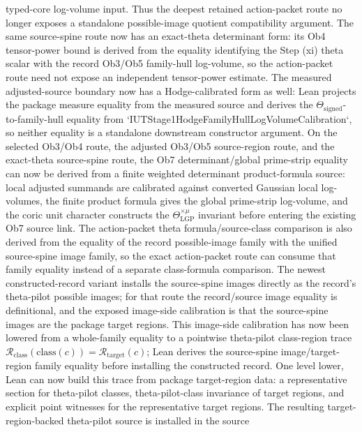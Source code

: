 \begin{proposition}
  typed-core log-volume input.
  Thus the deepest retained action-packet route no longer exposes a standalone
  possible-image quotient compatibility argument.  The same source-spine route
  now has an exact-theta determinant form: its Ob4 tensor-power bound is
  derived from the equality identifying the Step (xi) theta scalar with the
  record Ob3/Ob5 family-hull log-volume, so the action-packet route need not
  expose an independent tensor-power estimate.  The measured adjusted-source
  boundary now has a Hodge-calibrated form as well: Lean projects the package
  measure equality from the measured source and derives the
  \(\Theta_{\mathrm{signed}}\)-to-family-hull equality from
  `IUTStage1HodgeFamilyHullLogVolumeCalibration`, so neither equality is a
  standalone downstream constructor argument.  On the selected Ob3/Ob4 route,
  the adjusted Ob3/Ob5 source-region route, and the exact-theta source-spine
  route, the Ob7 determinant/global prime-strip equality can now be derived
  from a finite weighted determinant product-formula source: local adjusted
  summands are calibrated against converted Gaussian local log-volumes, the
  finite product formula gives the global prime-strip log-volume, and the
  coric unit character constructs the
  \(\Theta^{\times\mu}_{\mathrm{LGP}}\) invariant before entering the existing
  Ob7 source link.  The action-packet theta
  formula/source-class comparison is also derived from the equality of the
  record possible-image family with the unified source-spine image family, so
  the exact action-packet route can consume that family equality instead of a
  separate class-formula comparison.  The newest constructed-record variant
  installs the source-spine images directly as the record's theta-pilot
  possible images; for that route the record/source image equality is
  definitional, and the exposed image-side calibration is that the source-spine
  images are the package target regions.  This image-side calibration has now
  been lowered from a whole-family equality to a pointwise theta-pilot
  class-region trace
  \(\mathcal R_{\mathrm{class}}(\mathrm{class}(c))
    = \mathcal R_{\mathrm{target}}(c)\);
  Lean derives the source-spine image/target-region family equality before
  installing the constructed record.  One level lower, Lean can now build this
  trace from package target-region data: a representative section for
  theta-pilot classes, theta-pilot-class invariance of target regions, and
  explicit point witnesses for the representative target regions.  The
  resulting target-region-backed theta-pilot source is installed in the source

\end{proposition}

